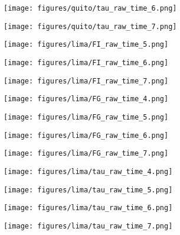 \documentclass[a4paper]{article}
\def\lthtmlcheckvsize{\ifdim\ht\sizebox<\vsize 
  \ifdim\wd\sizebox<\hsize\expandafter\hfill\fi \expandafter\vfill
  \else\expandafter\vss\fi}%
\begin{document}
{\newpage\clearpage
{}%
\texttt{[image: figures/quito/tau\_raw\_time\_6.png]}%
\lthtmlpictureZ
\lthtmlcheckvsize\clearpage}

{\newpage\clearpage
{}%
\texttt{[image: figures/quito/tau\_raw\_time\_7.png]}%
\lthtmlpictureZ
\lthtmlcheckvsize\clearpage}

{\newpage\clearpage
{}%
\texttt{[image: figures/lima/FI\_raw\_time\_5.png]}%
\lthtmlpictureZ
\lthtmlcheckvsize\clearpage}

{\newpage\clearpage
{}%
\texttt{[image: figures/lima/FI\_raw\_time\_6.png]}%
\lthtmlpictureZ
\lthtmlcheckvsize\clearpage}

{\newpage\clearpage
{}%
\texttt{[image: figures/lima/FI\_raw\_time\_7.png]}%
\lthtmlpictureZ
\lthtmlcheckvsize\clearpage}

{\newpage\clearpage
{}%
\texttt{[image: figures/lima/FG\_raw\_time\_4.png]}%
\lthtmlpictureZ
\lthtmlcheckvsize\clearpage}

{\newpage\clearpage
{}%
\texttt{[image: figures/lima/FG\_raw\_time\_5.png]}%
\lthtmlpictureZ
\lthtmlcheckvsize\clearpage}

{\newpage\clearpage
{}%
\texttt{[image: figures/lima/FG\_raw\_time\_6.png]}%
\lthtmlpictureZ
\lthtmlcheckvsize\clearpage}

{\newpage\clearpage
{}%
\texttt{[image: figures/lima/FG\_raw\_time\_7.png]}%
\lthtmlpictureZ
\lthtmlcheckvsize\clearpage}

{\newpage\clearpage
{}%
\texttt{[image: figures/lima/tau\_raw\_time\_4.png]}%
\lthtmlpictureZ
\lthtmlcheckvsize\clearpage}

{\newpage\clearpage
{}%
\texttt{[image: figures/lima/tau\_raw\_time\_5.png]}%
\lthtmlpictureZ
\lthtmlcheckvsize\clearpage}

{\newpage\clearpage
{}%
\texttt{[image: figures/lima/tau\_raw\_time\_6.png]}%
\lthtmlpictureZ
\lthtmlcheckvsize\clearpage}

{\newpage\clearpage
{}%
\texttt{[image: figures/lima/tau\_raw\_time\_7.png]}%
\lthtmlpictureZ
\lthtmlcheckvsize\clearpage}

\end{document}
